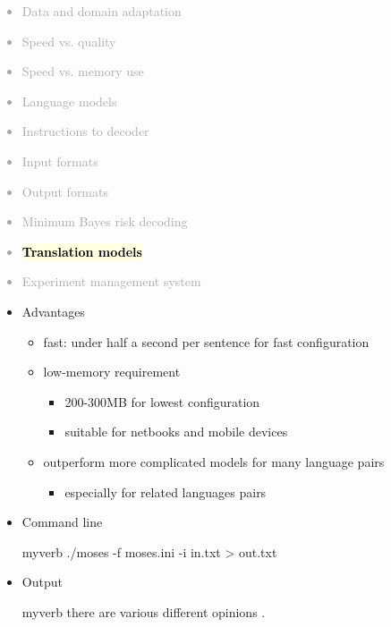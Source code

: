 \documentclass[landscape]{uedslides2C}
\newcommand{\currenttopic}[1]{\colorbox{lightyellow}{\textcolor{black}{\bf #1}}}
\begin{document}

\vspace{-5mm}
\textcolor{darkgrey}{
\begin{itemize} \itemsep -1mm
\item Data and domain adaptation
\item Speed vs. quality
\item Speed vs. memory use
\item Language models
\item Instructions to decoder
\item Input formats
\item Output formats
\item Minimum Bayes risk decoding
\item \currenttopic{Translation models}
\item Experiment management system
\end{itemize}
}


\begin{itemize}
\item Advantages
\vspace{-1mm}
\begin{itemize}
\item fast: under half a second per sentence for fast configuration
\item low-memory requirement
	\begin{itemize}
	\item 200-300MB for lowest configuration
	\item suitable for netbooks and mobile devices
	\end{itemize}
\item outperform more complicated models for many language pairs
	\begin{itemize}
	\item especially for related languages pairs
	\end{itemize}
\end{itemize}
\item Command line   
\vspace{-4mm}
\begin{center}
\begin{SaveVerbatim}{myverb}
 ./moses -f moses.ini -i in.txt > out.txt
\end{SaveVerbatim}
\colorbox{gray}{}
\end{center}
\item Output
\vspace{-4mm}
\begin{center}
\begin{SaveVerbatim}{myverb}
there are various different opinions .
\end{SaveVerbatim}
\colorbox{gray}{}
\end{center}
\end{itemize}
\end{document}
